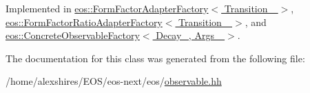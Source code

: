 Implemented in \hyperlink{classeos_1_1FormFactorAdapterFactory_a87734f36d23509771fab23e13ed60ff3}{eos::FormFactorAdapterFactory$<$ Transition\_\- $>$}, \hyperlink{classeos_1_1FormFactorRatioAdapterFactory_a2382bfbe9ce737d606a9d5abc271f92d}{eos::FormFactorRatioAdapterFactory$<$ Transition\_\- $>$}, and \hyperlink{classeos_1_1ConcreteObservableFactory_ace91bf102a1303e6efedaee0e8b2f8e6}{eos::ConcreteObservableFactory$<$ Decay\_\-, Args\_\- $>$}.

The documentation for this class was generated from the following file:\begin{DoxyCompactItemize}
\item 
/home/alexshires/EOS/eos-\/next/eos/\hyperlink{observable_8hh}{observable.hh}\end{DoxyCompactItemize}
